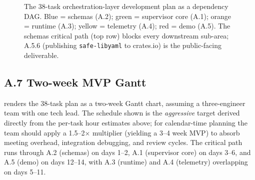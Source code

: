 \documentclass[12pt]{article}
\theoremstyle{definition}
\theoremstyle{remark}
\newcommand{\safelibyaml}{\texttt{safe-libyaml}}
\begin{document}
\begin{figure}[h]
\caption{The 38-task orchestration-layer development plan as a
dependency DAG. Blue = schemas (A.2); green = supervisor core (A.1);
orange = runtime (A.3); yellow = telemetry (A.4); red = demo (A.5).
The schemas critical path (top row) blocks every downstream sub-area;
A.5.6 (publishing \safelibyaml{} to crates.io) is the public-facing
deliverable.}
\label{fig:devplan-dag}
\end{figure}

\subsection*{A.7 Two-week MVP Gantt}

 renders the 38-task plan as a two-week Gantt
chart, assuming a three-engineer team with one tech lead. The schedule
shown is the \emph{aggressive} target derived directly from the per-task
hour estimates above; for calendar-time planning the team should apply a
1.5--2$\times$ multiplier (yielding a 3--4 week MVP) to absorb meeting
overhead, integration debugging, and review cycles. The critical path
runs through A.2 (schemas) on days 1--2, A.1 (supervisor core) on days
3--6, and A.5 (demo) on days 12--14, with A.3 (runtime) and A.4
(telemetry) overlapping on days 5--11.
\end{document}
